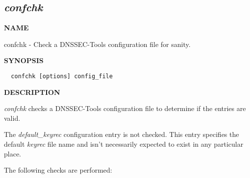 \clearpage

\subsection{{\it confchk}}


{\bf NAME}

confchk - Check a DNSSEC-Tools configuration file for sanity.

{\bf SYNOPSIS}

\begin{verbatim}  confchk [options] config_file\end{verbatim}

{\bf DESCRIPTION}

{\it confchk} checks a DNSSEC-Tools configuration file to determine if the
entries are valid.

The {\it default\_keyrec} configuration entry is not checked.  This entry
specifies the default {\it keyrec} file name and isn't necessarily expected
to exist in any particular place.

The following checks are performed:

